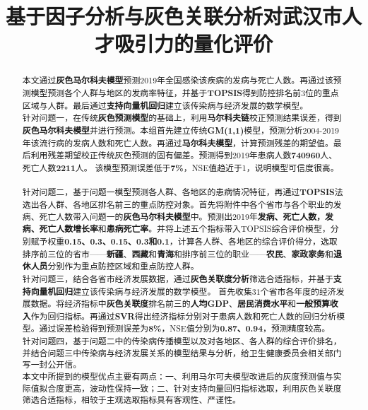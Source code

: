 \documentclass{whutmod}
\title{基于因子分析与灰色关联分析对武汉市人才吸引力的量化评价}
\begin{document}
	
	\begin{abstract}

本文通过\textbf{灰色马尔科夫模型}预测2019年全国感染该疾病的发病与死亡人数。再通过该预测模型预测各个人群与地区的发病率特征，并基于\textbf{TOPSIS}得到防控排名前$3$位的重点区域与人群。最后通过\textbf{支持向量机回归}建立该传染病与经济发展的数学模型。
~\\

针对问题一，在传统\textbf{灰色预测模型}的基础上，利用\textbf{马尔科夫链}校正预测结果误差，得到\textbf{灰色马尔科夫模型}并进行预测。本组首先建立传统\textbf{GM(1,1)}模型，预测分析2004-2019年该流行病的发病人数和死亡人数。再通过\textbf{马尔科夫模型}，计算预测残差的期望值。最后利用残差期望校正传统灰色预测的固有偏差。预测得到2019年患病人数\textbf{740960}人、死亡人数\textbf{2211}人。	该模型预测误差低于\textbf{7\%}，NSE值趋近于1，说明模型可信度很高。
~\\

针对问题二，基于问题一模型预测各人群、各地区的患病情况特征，再通过\textbf{TOPSIS}法选出各人群、各地区排名前三的重点防控对象。首先将附件中各个省市与各个职业的发病、死亡人数带入问题一的\textbf{灰色马尔科夫模型}中。预测出2019年\textbf{发病、死亡人数，发病、死亡人数增长率}和\textbf{患病死亡率}。并将上述五个指标带入TOPSIS综合评价模型，分别赋予权重\textbf{0.15、0.3、0.15、0.3和0.1}，计算各人群、各地区的综合评价得分，选取排序前三位的省市——\textbf{新疆}、\textbf{西藏}和\textbf{青海}和排序前三位的职业——\textbf{农民}、\textbf{家政家务}和\textbf{退休人员}分别作为重点防控区域和重点防控人群。
~\\


针对问题三，结合各省市经济发展数据，通过\textbf{灰色关联度分析}筛选合适指标，并基于\textbf{支持向量机回归}建立该传染病与经济发展的数学模型。  首先收集$31$个省市各年度的经济发展数据。将经济指标中\textbf{灰色关联度}排名前三的\textbf{人均GDP}、\textbf{居民消费水平}和\textbf{一般预算收入}作为回归指标。再通过\textbf{SVR}得出经济指标分别对于患病人数和死亡人数的回归分析模型。通过误差检验得到预测误差为\textbf{8\%}，NSE值分别为\textbf{0.87、0.94}，预测精度较高。
~\\

针对问题四，基于问题二中的传染病传播模型以及对各地区、各人群的综合评价排名，并结合问题三中传染病与经济发展关系的模型结果与分析，给卫生健康委员会相关部门写一封公开信。
~\\

本文中所提到的模型优点主要有两点：一、利用马尔可夫模型改进后的灰度预测值与实际值拟合度更高，波动性保持一致；二、针对支持向量回归指标选取，利用灰色关联度筛选合适指标，相较于主观选取指标具有客观性、严谨性。


	
  


	\end{abstract}
	\tableofcontents
	\newpage	%
	
\end{document}
